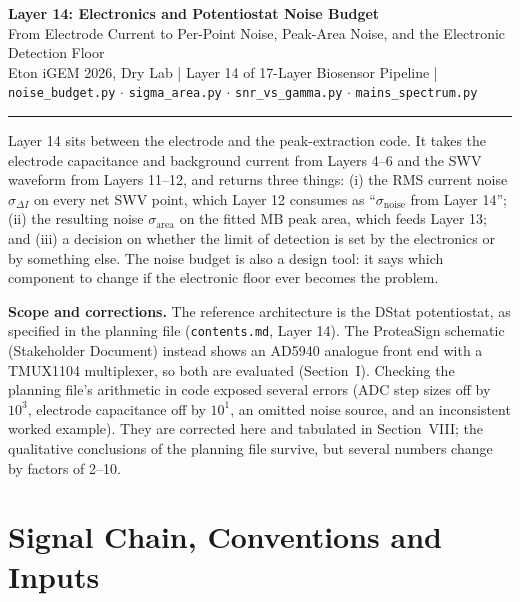 \documentclass[10pt]{article}
\numberwithin{equation}{section}
\begin{document}
\begin{center}
{\LARGE\bfseries Layer 14: Electronics and Potentiostat Noise Budget}\\[0.35em]
{\large From Electrode Current to Per-Point Noise, Peak-Area Noise, and the Electronic Detection Floor}\\[0.3em]
{\small\color{gray} Eton iGEM 2026, Dry Lab \;|\; Layer 14 of 17-Layer Biosensor Pipeline \;|\;
\texttt{noise\_budget.py} $\cdot$ \texttt{sigma\_area.py} $\cdot$ \texttt{snr\_vs\_gamma.py} $\cdot$ \texttt{mains\_spectrum.py}}
\end{center}
\vspace{-0.4em}\rule{\textwidth}{0.4pt}

Layer 14 sits between the electrode and the peak-extraction code. It takes the electrode capacitance and background current
from Layers 4--6 and the SWV waveform from Layers 11--12, and returns three things: (i) the RMS current noise
$\sigma_{\Delta I}$ on every net SWV point, which Layer 12 consumes as ``$\sigma_{\text{noise}}$ from Layer 14''; (ii) the
resulting noise $\sigma_{\text{area}}$ on the fitted MB peak area, which feeds Layer 13; and (iii) a decision on whether the
limit of detection is set by the electronics or by something else. The noise budget is also a design tool: it says which
component to change if the electronic floor ever becomes the problem.

\textbf{Scope and corrections.} The reference architecture is the DStat potentiostat, as specified in the planning file
(\texttt{contents.md}, Layer 14). The ProteaSign schematic (Stakeholder Document) instead shows an AD5940 analogue front
end with a TMUX1104 multiplexer, so both are evaluated (Section~I). Checking the planning file's arithmetic in code exposed several
errors (ADC step sizes off by $10^3$, electrode capacitance off by $10^1$, an omitted noise source, and an
inconsistent worked example). They are corrected here and tabulated in Section~VIII; the qualitative conclusions of the planning
file survive, but several numbers change by factors of 2--10.

\section{Signal Chain, Conventions and Inputs}
\end{document}
